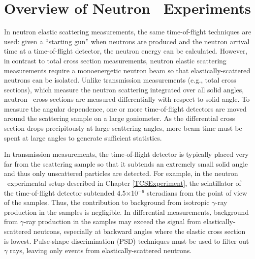 \section{Overview of Neutron \el\ Experiments}
In neutron elastic scattering measurements, the same time-of-flight techniques are used:
given a ``starting gun'' when neutrons are produced and the neutron arrival time
at a time-of-flight detector, the neutron energy can be calculated.
However, in contrast to total cross section measurements, neutron elastic scattering
measurements require a monoenergetic neutron beam so that elastically-scattered
neutrons can be isolated. Unlike transmission measurements (e.g., total cross
sections), which measure the neutron scattering integrated
over all solid angles, neutron \el\ cross sections are measured differentially with respect to 
solid angle. To measure the angular dependence, one or more time-of-flight detectors
are moved around the scattering sample on a large goniometer. As the differential cross section 
drops precipitously at large scattering angles, more beam time must be spent at
large angles to generate sufficient statistics.

In transmission measurements, the time-of-flight detector is typically placed
very far from the scattering sample so that it subtends an extremely small solid
angle and thus only unscattered particles are detected.
For example, in the neutron \tot\ experimental setup described in Chapter
\ref{TCSExperiment}, the scintillator of the time-of-flight detector subtended
4.5$\times$10$^{-6}$ steradians from the point of view of the samples. Thus, the
contribution to background from isotropic $\gamma$-ray production in the samples is negligible.
In differential measurements,
background from $\gamma$-ray production in the samples may exceed the signal
from elastically-scattered neutrons, especially at backward angles where the elastic
cross section is lowest. Pulse-shape discrimination (\gls{PSD})
techniques must be used to filter out 
$\gamma$ rays, leaving only events from elastically-scattered neutrons.

